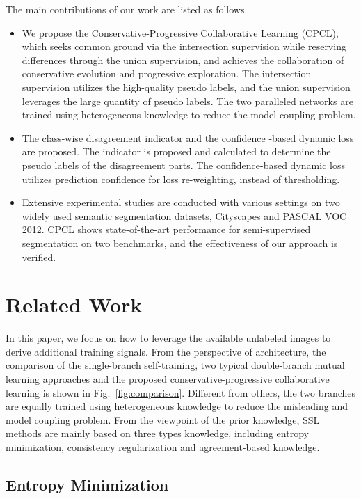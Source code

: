 \documentclass[journal]{IEEEtran}
\begin{document}
The main contributions of our work are listed as follows.

\begin{itemize}
  \item We propose the Conservative-Progressive Collaborative Learning (CPCL), which seeks common ground via the intersection supervision while reserving differences 
  through the union supervision, and achieves the collaboration of conservative evolution and progressive exploration. The intersection supervision utilizes 
  the high-quality pseudo labels, and the union supervision leverages the large quantity of pseudo labels. The two paralleled networks are trained using heterogeneous 
  knowledge to reduce the model coupling problem.

  \item The class-wise disagreement indicator and the confidence -based dynamic loss are proposed. The indicator is proposed and calculated to determine the pseudo 
  labels of the disagreement parts. The confidence-based dynamic loss utilizes prediction confidence for loss re-weighting, instead of thresholding.
  
  \item Extensive experimental studies are conducted with various settings on two widely used semantic segmentation datasets, Cityscapes and PASCAL VOC 2012. 
  CPCL shows state-of-the-art performance for semi-supervised segmentation on two benchmarks, and the effectiveness of our approach is verified.
\end{itemize}


\section{Related Work}

In this paper, we focus on how to leverage the available unlabeled images to derive additional training signals. From the perspective of architecture, the comparison 
of the single-branch self-training, two typical double-branch mutual learning approaches and the proposed conservative-progressive collaborative learning is shown in 
Fig.~\ref{fig:comparison}. Different from others, the two branches are equally trained using heterogeneous knowledge to reduce the misleading and model coupling problem. 
From the viewpoint of the prior knowledge, SSL methods are mainly based on three types knowledge, including entropy minimization, consistency regularization and 
agreement-based knowledge.

\subsection{Entropy Minimization}
\end{document}
